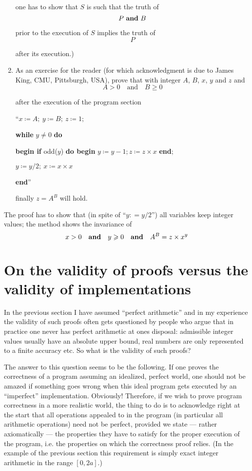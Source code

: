 \begin{enumerate}[leftmargin=*, itemindent=3\parindent, label=\textit{Remark }\arabic*.]
	one has to show that $S$ is such that the truth of
	$$
	P \text{ \textbf{and} } B
	$$
	
	prior to the execution of $S$ implies the truth of
	$$ P $$
	
	after its execution.)
	\item As an exercise for the reader (for which acknowledgment is due to James King, CMU, Pittsburgh, USA), prove that with integer $A$, $B$, $x$, $y$ and $z$ and
	$$
	A > 0\quad \text{and}\quad B\geqslant 0
	$$
	
	after the execution of the program section
	
	{
		\setlength{\parindent}{8em}
		``$x \coloneq A;\ y \coloneq B;\ z \coloneq 1;$
		
		\textbf{while} $y \neq 0$ \textbf{do}
		
		\quad\textbf{begin if} odd($y$) \textbf{do begin} $y \coloneq y - 1; z \coloneq z \times x$ \textbf{end};
		
		\quad\quad $y \coloneq y/2;\ x \coloneq x \times x$
		
		\quad\textbf{end}''
	}
	
	finally $z = A^B$ will hold.
\end{enumerate}


The proof has to show that (in spite of ``$y: = y/2$'') all variables keep integer values; the method shows the invariance of
$$
x > 0\quad \text{\textbf{and}}\quad y \geqslant 0\quad \text{\textbf{and}}\quad A^B = z \times x^y
$$

\section{On the validity of proofs versus the validity of implementations}

In the previous section I have assumed ``perfect arithmetic'' and in my experience the validity of such proofs often gets questioned by people who argue that in practice one never has perfect arithmetic at ones disposal: admissible integer values usually have an absolute upper bound, real numbers are only represented to a finite accuracy etc. So what is the validity of such proofs?

The answer to this question seems to be the following. If one proves the correctness of a program assuming an idealized, perfect world, one should not be amazed if something goes wrong when this ideal program gets executed by an ``imperfect'' implementation. Obviously! Therefore, if we wish to prove program correctness in a more realistic world, the thing to do is to acknowledge right at the start that all operations appealed to in the program (in particular all arithmetic operations) need not be perfect, provided we state --- rather axiomatically --- the properties they have to satisfy for the proper execution of the program, i.e. the properties on which the correctness proof relies. (In the example of the previous section this requirement is simply exact integer arithmetic in the range $[0, 2a]$.)

